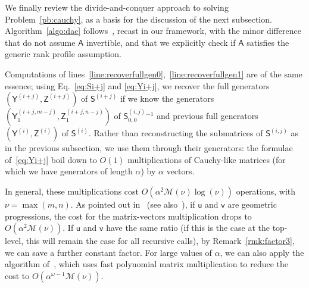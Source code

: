\documentclass[sigconf]{acmart}
\newcommand{\vu}{\ensuremath{\mathsf{u}}}
\newcommand{\vv}{\ensuremath{\mathsf{v}}}
\newcommand{\mA}{\ensuremath{\mathsf{A}}}
\newcommand{\mS}{\ensuremath{\mathsf{S}}}
\newcommand{\mY}{\ensuremath{\mathsf{Y}}}
\newcommand{\mZ}{\ensuremath{\mathsf{Z}}}
\newcommand{\M}{\ensuremath{\mathscr{M}}}
\newcommand{\mx}{\ensuremath{\nu}}
\theoremstyle{acmdefinition}
\begin{document}
We finally review the divide-and-conquer approach to solving
Problem~\ref{pb:cauchy}, as a basis for the discussion of the next
subsection. Algorithm~\ref{algo:dac} follows~\cite{JeMo10}, recast in
our framework, with the minor difference that do not assume $\mA$
invertible, and that we explicitly check if $\mA$ satisfies the
generic rank profile assumption.

%
Computations of
lines~\ref{line:recoverfullgen0},~\ref{line:recoverfullgen1} are of
the same essence; using Eq.~\eqref{eq:Si+j} and \eqref{eq:Yi+j}, we
recover the full generators $(\mY^{(i+j)},\mZ^{(i+j)})$ of
$\mS^{(i+j)}$ if we know the generators
$(\mY^{(i+j,m-j)}_1,\mZ^{(i+j,n-j)}_1)$ of $\mS^{(i,j)}_{0,0}{}^{-1}$
and previous full generators $(\mY^{(i)},\mZ^{(i)})$ of $\mS^{(i)}$.
Rather than reconstructing the submatrices of $\mS^{(i,j)}$ as in the
previous subsection, we use them through their generators: the
formulae of~\eqref{eq:Yi+j} boil down to $O(1)$ multiplications of
Cauchy-like matrices (for which we have generators of length $\alpha$)
by $\alpha$ vectors.

In general, these multiplications cost $O(\alpha^2 \M(\mx) \log(\mx))$
operations, with $\mx=\max(m,n)$.  As pointed out
in~\cite[Theorem~5.3.1]{Pan01} (see also~\cite{ChPa00}), if $\vu$ and
$\vv$ are geometric progressions, the cost for the matrix-vectors
multiplication drops to $O(\alpha^2 \M(\mx))$.  If $\vu$ and $\vv$
have the same ratio (if this is the case at the top-level, this will
remain the case for all recursive calls), by Remark~\ref{rmk:factor3},
we can save a further constant factor.  For large values of $\alpha$,
we can also apply the algorithm of~\cite{BoJeMoSc16}, which uses fast
polynomial matrix multiplication to reduce the cost to
$O(\alpha^{\omega-1} \M(\mx))$.

\end{document}
